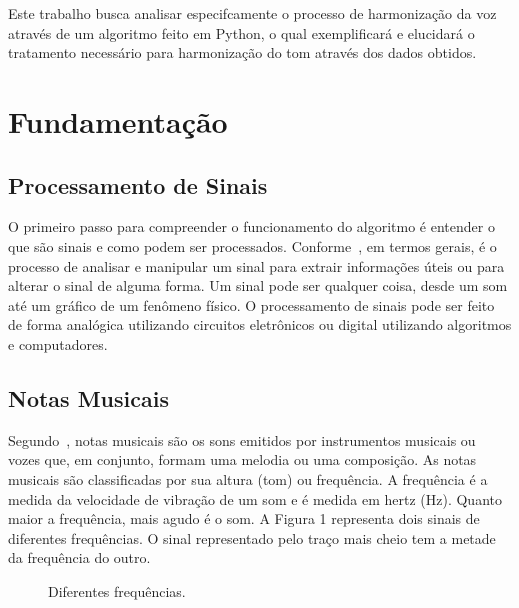 \documentclass{sbrt}
\begin{document}
Este trabalho busca analisar especifcamente o processo de harmonização da voz através de um algoritmo feito em Python, o
qual exemplificará e elucidará o tratamento necessário para harmonização do tom através dos dados obtidos.


\section{Fundamentação}

\subsection{Processamento de Sinais}

O primeiro passo para compreender o funcionamento do algoritmo é entender o que são sinais e como podem ser processados.
Conforme~\cite{prandoni2008signal}, em termos gerais, é o processo de analisar e manipular um sinal para extrair
informações úteis ou para alterar o sinal de alguma forma. Um sinal pode ser qualquer coisa, desde um som até um gráfico
de um fenômeno físico. O processamento de sinais pode ser feito de forma analógica utilizando circuitos eletrônicos ou
digital utilizando algoritmos e computadores.

\subsection{Notas Musicais}

Segundo~\cite{moretti2003prototipo}, notas musicais são os sons emitidos por instrumentos musicais ou vozes que, em
conjunto, formam uma melodia ou uma composição. As notas musicais são classificadas por sua altura (tom) ou frequência.
A frequência é a medida da velocidade de vibração de um som e é medida em hertz (Hz). Quanto maior a frequência, mais
agudo é o som. A Figura 1 representa dois sinais de diferentes frequências. O sinal representado pelo traço mais cheio
tem a metade da frequência do outro.


\begin{figure}[ht]
  \centering
  \caption{\label{fig:sine}Diferentes frequências.}
\end{figure}
\end{document}
